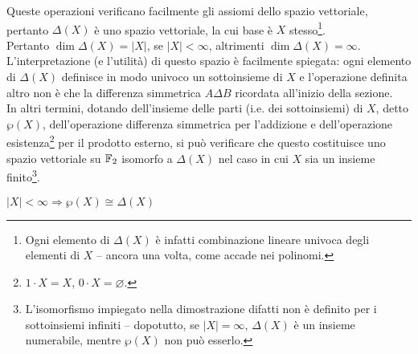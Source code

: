 \documentclass[a4paper]{article}
\begin{document}
Queste operazioni verificano facilmente gli assiomi dello spazio vettoriale, pertanto $\Delta (X)$ è uno spazio vettoriale, la cui base è $X$ stesso\footnote{Ogni elemento di $\Delta (X)$ è infatti combinazione lineare univoca degli elementi di $X$ -- ancora una volta, come accade nei polinomi.}. \\

Pertanto $\dim \Delta (X) = |X|$, se $|X| < \infty$, altrimenti $\dim \Delta (X) = \infty$. \\

L'interpretazione (e l'utilità) di questo spazio è facilmente spiegata: ogni elemento di
$\Delta (X)$ definisce in modo univoco un sottoinsieme di $X$ e l'operazione definita
altro non è che la differenza simmetrica $A \Delta B$ ricordata all'inizio della sezione. \\

In altri termini, dotando dell'insieme delle parti (i.e. dei sottoinsiemi) di $X$, detto
$\wp(X)$, dell'operazione differenza simmetrica per l'addizione e dell'operazione esistenza\footnote{$1 \cdot X = X$, $0 \cdot X = \varnothing$.} per il prodotto esterno, si può verificare che questo costituisce
uno spazio vettoriale su $\mathbb{F}_2$ isomorfo a $\Delta (X)$ nel caso in cui $X$ sia un insieme finito\footnote{L'isomorfismo impiegato nella dimostrazione difatti non è definito per i sottoinsiemi infiniti -- dopotutto, se $|X| = \infty$, $\Delta (X)$ è un insieme numerabile, mentre $\wp(X)$ non può esserlo.}.

\begin{theorem}
$|X| < \infty \Rightarrow \wp(X) \cong \Delta (X)$
\end{theorem}
\end{document}
